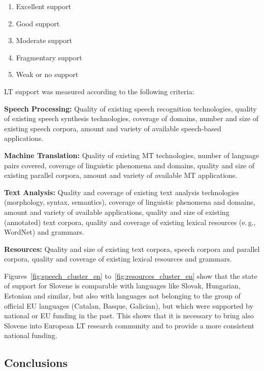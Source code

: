 \begin{multicols}{2}
\begin{enumerate}
\item Excellent support
\item Good support
\item Moderate support
\item Fragmentary support
\item Weak or no support
\end{enumerate}

LT support was measured according to the following criteria:

\textbf{Speech Processing:} Quality of existing speech recognition technologies, quality of existing speech synthesis technologies, coverage of domains, number and size of existing speech corpora, amount and variety of available speech-based applications.\vspace*{-0.1 cm}

\textbf{Machine Translation:} Quality of existing MT technologies, number of language pairs covered, coverage of linguistic phenomena and domains, quality and size of existing parallel corpora, amount and variety of available MT applications.\vspace*{-0.1 cm}

\textbf{Text Analysis:} Quality and coverage of existing text analysis technologies (morphology, syntax, semantics), coverage of linguistic phenomena and domains, amount and variety of available applications, quality and size of existing (annotated) text corpora, quality and coverage of existing lexical resources (e.\,g., WordNet) and grammars.\vspace*{-0.1 cm}

\textbf{Resources:} Quality and size of existing text corpora, speech corpora and parallel corpora, quality and coverage of existing lexical resources and grammars.

Figures~\ref{fig:speech_cluster_en} to~\ref{fig:resources_cluster_en} show that the state of support for Slovene is comparable with languages like Slovak, Hungarian, Estonian and similar, but also with languages not belonging to the group of official EU languages (Catalan, Basque, Galician), but which were supported by national or EU funding in the past. This shows that it is necessary to bring also Slovene into European LT research community and to provide a more consistent national funding.

\subsection{Conclusions}


\end{multicols}
